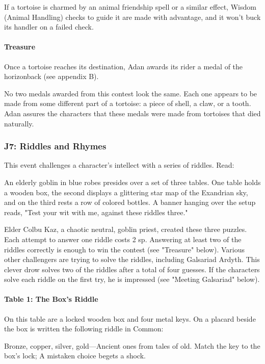 \documentclass[10pt,a4paper,twoside,twocolumn,openany,nodeprecatedcode]{dndbook}
\begin{document}
If a tortoise is charmed by an animal friendship spell or a similar effect, Wisdom (Animal Handling) checks to guide it are made with advantage, and it won't buck its handler on a failed check.

\paragraph{Treasure}
Once a tortoise reaches its destination, Adan awards its rider a medal of the horizonback (see appendix B).

No two medals awarded from this contest look the same. Each one appears to be made from some different part of a tortoise: a piece of shell, a claw, or a tooth. Adan assures the characters that these medals were made from tortoises that died naturally.

\subsubsection{J7: Riddles and Rhymes}
This event challenges a character's intellect with a series of riddles. Read:

\begin{DndReadAloud}{}
An elderly goblin in blue robes presides over a set of three tables. One table holds a wooden box, the second displays a glittering star map of the Exandrian sky, and on the third rests a row of colored bottles. A banner hanging over the setup reads, "Test your wit with me, against these riddles three."

\end{DndReadAloud}

Elder Colbu Kaz, a chaotic neutral, goblin priest, created these three puzzles. Each attempt to answer one riddle costs 2 sp. Answering at least two of the riddles correctly is enough to win the contest (see "Treasure" below). Various other challengers are trying to solve the riddles, including Galsariad Ardyth. This clever drow solves two of the riddles after a total of four guesses. If the characters solve each riddle on the first try, he is impressed (see "Meeting Galsariad" below).

\paragraph{Table 1: The Box's Riddle}
On this table are a locked wooden box and four metal keys. On a placard beside the box is written the following riddle in Common:

\begin{DndReadAloud}{}
Bronze, copper, silver, gold—Ancient ones from tales of old. Match the key to the box's lock; A mistaken choice begets a shock.

\end{DndReadAloud}
\end{document}
